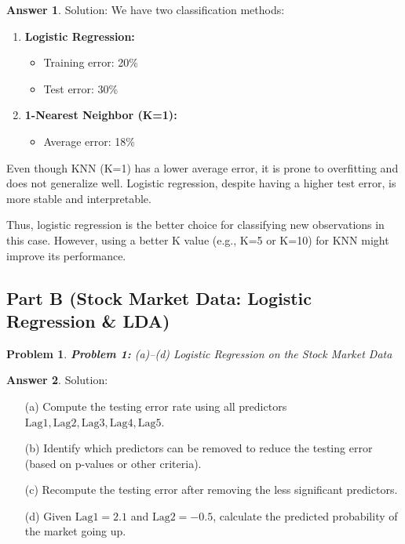 \documentclass[12pt]{article}
\newtheorem{problem}{Problem} %
\theoremstyle{definition}
\newtheorem*{answer}{Answer}
\newcommand{\solution}{\textcolor{PineGreen}{Solution:\newline}}
\begin{document}
\begin{answer}
\solution
We have two classification methods:

\begin{enumerate}
    \item \textbf{Logistic Regression:}
    \begin{itemize}
        \item Training error: 20\%
        \item Test error: 30\%
    \end{itemize}
    
    \item \textbf{1-Nearest Neighbor (K=1):}
    \begin{itemize}
        \item Average error: 18\%
    \end{itemize}
\end{enumerate}

Even though KNN (K=1) has a lower average error, it is prone to overfitting and does not generalize well. Logistic regression, despite having a higher test error, is more stable and interpretable.

Thus, logistic regression is the better choice for classifying new observations in this case. However, using a better K value (e.g., K=5 or K=10) for KNN might improve its performance.
\end{answer}

\subsection*{Part B (Stock Market Data: Logistic Regression \& LDA)}

\setcounter{problem}{0}
\begin{problem}
\textbf{Problem 1:} (a)--(d) Logistic Regression on the Stock Market Data
\end{problem}

\begin{answer}
\solution
\begin{itemize}
    \item[(a)] Compute the testing error rate using all predictors \(\text{Lag1}, \text{Lag2}, \text{Lag3}, \text{Lag4}, \text{Lag5}\).
    \item[(b)] Identify which predictors can be removed to reduce the testing error (based on p-values or other criteria).
    \item[(c)] Recompute the testing error after removing the less significant predictors.
    \item[(d)] Given \(\text{Lag1} = 2.1\) and \(\text{Lag2} = -0.5\), calculate the predicted probability of the market going up.
\end{itemize}
\end{answer}
\end{document}
